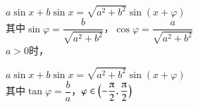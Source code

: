 \begin{description}[leftmargin=0pt,labelsep=0pt]
\begin{itemizeMy}[万能公式\hspace{4em}]
          \item $\cos{\alpha}=\dfrac{1-\tan^2{\dfrac{\alpha}2}}{1+\tan^2{\dfrac{\alpha}2}}}$
          \item $\tan{\alpha}=\dfrac{2\tan{\dfrac{\alpha}2}}{1-\tan^2{\dfrac{\alpha}2}}}$
        \end{itemizeMy}
      \item%
        \begin{itemizeMy}
          \item $a\sin x+b\sin x=\sqrt{a^2+b^2}\sin(x+\varphi)$\\
          其中$\sin\varphi=\dfrac{b}{\sqrt{a^2+b^2}}$，$\cos\varphi=\dfrac{a}{\sqrt{a^2+b^2}}$\\
          $a>0$时，
          \item $a\sin x+b\sin x=\sqrt{a^2+b^2}\sin(x+\varphi)$\\
          其中$\tan\varphi=\dfrac{b}a$，$
          \varphi\in\Bigl(-\dfrac{\piup}2,\dfrac{\piup}2\Bigr)$
        \end{itemizeMy}
  \end{description}
\clearpage
